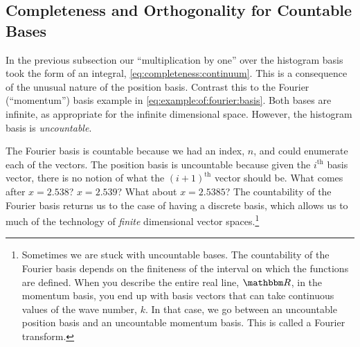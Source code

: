 \documentclass[12pt, oneside]{report}    %
\begin{document}
\subsection{Completeness and Orthogonality for Countable Bases}

In the previous subsection our ``multiplication by one'' over the histogram basis took the form of an integral, \eqref{eq:completeness:continuum}. This is a consequence of the unusual nature of the position basis. Contrast this to the Fourier (``momentum'') basis example in \eqref{eq:example:of:fourier:basis}. Both bases are infinite, as appropriate for the infinite dimensional space. However, the histogram basis is \emph{uncountable}. 

The Fourier basis is countable because we had an index, $n$, and could enumerate each of the vectors. The position basis is uncountable because given the $i^\text{th}$ basis vector, there is no notion of what the $(i+1)^\text{th}$ vector should be. What comes after $x=2.538$? $x=2.539$? What about $x=2.5385$? The countability of the Fourier basis returns us to the case of having a discrete basis, which allows us to much of the technology of \emph{finite} dimensional vector spaces.\footnote{Sometimes we are stuck with uncountable bases. The countability of the Fourier basis depends on the finiteness of the interval on which the functions are defined. When you describe the entire real line, $\RR$, in the momentum basis, you end up with basis vectors that can take continuous values of the wave number, $k$. In that case, we go between an uncountable position basis and an uncountable momentum basis. This is called a Fourier transform.}
\end{document}
